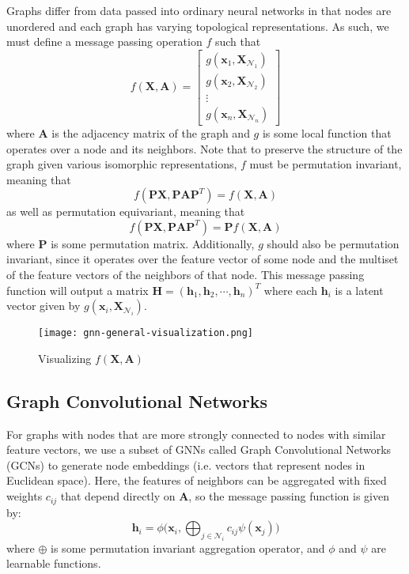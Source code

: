 \documentclass[final]{article}
\begin{document}
Graphs differ from data passed into ordinary neural networks in that nodes are unordered and each graph has varying topological representations. As such, we must define a message passing operation \cite{petar_gnn_slides} $f$ such that \[ f(\textbf{X}, \textbf{A}) = \begin{bmatrix}
g(\textbf{x}_1, \textbf{X}_{\mathcal{N}_1} ) \\
g(\textbf{x}_2, \textbf{X}_{\mathcal{N}_2} ) \\
\vdots \\
g(\textbf{x}_n, \textbf{X}_{\mathcal{N}_n} )
\end{bmatrix} \]
where $\textbf{A}$ is the adjacency matrix of the graph and $g$ is some local function that operates over a node and its neighbors. Note that to preserve the structure of the graph given various isomorphic representations, $f$ must be permutation invariant, meaning that $$f(\textbf{PX}, \textbf{PAP}^T) = f(\textbf{X}, \textbf{A})$$ as well as permutation equivariant, meaning that $$f(\textbf{PX}, \textbf{PAP}^T) = \textbf{P}f(\textbf{X}, \textbf{A})$$
where $\textbf{P}$ is some permutation matrix. \cite{petar_gnn_slides} Additionally, $g$ should also be permutation invariant, since it operates over the feature vector of some node and the multiset of the feature vectors of the neighbors of that node. This message passing function will output a matrix $\textbf{H} = (\textbf{h}_1, \textbf{h}_2, \cdots, \textbf{h}_n)^T$ where each $\textbf{h}_i$ is a latent vector given by $g(\textbf{x}_i, \textbf{X}_{\mathcal{N}_i})$. \\

\begin{figure}[h]
  \centering
 \texttt{[image: gnn-general-visualization.png]}
  \caption{Visualizing $f(\textbf{X}, \textbf{A})$ \cite{petar_gnn_slides}}
 \end{figure} 
\subsection{Graph Convolutional Networks}
For graphs with nodes that are more strongly connected to nodes with similar feature vectors, we use a subset of GNNs called Graph Convolutional Networks (GCNs) to generate node embeddings (i.e. vectors that represent nodes in Euclidean space). Here, the features of neighbors can be aggregated with fixed weights $c_{ij}$ that depend directly on $\textbf{A}$, so the message passing function is given by: 
$$\textbf{h}_i = \phi \bigg( \textbf{x}_i, \bigoplus_{j \in \mathcal{N}_i} c_{ij} \psi (\textbf{x}_j)\bigg)$$
where $\oplus$ is some permutation invariant aggregation operator, and $\phi$ and $\psi$ are learnable functions. \cite{petar_gnn_slides}
\end{document}
